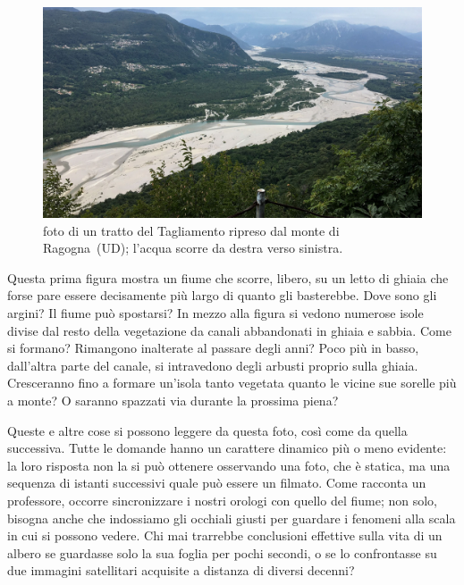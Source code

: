 

\begin{figure}[h]
	\centering
	\includegraphics[width=\textwidth]{files/foto_flagogna.jpg}
	\caption[foto di un tratto del Tagliamento ripreso dal monte di Ragogna]{foto di un tratto del Tagliamento ripreso dal monte di Ragogna~(UD); l'acqua scorre da destra verso sinistra.
	}
	\label{fig:foto-ragogna}
\end{figure}



Questa prima figura mostra un fiume che scorre, libero, su un letto di ghiaia che forse pare essere decisamente più largo di quanto gli basterebbe. 
Dove sono gli argini? Il fiume può spostarsi? 
%
In mezzo alla figura si vedono numerose isole divise dal resto della vegetazione da canali abbandonati in ghiaia e sabbia. 
Come si formano? Rimangono inalterate al passare degli anni? 
%
Poco più in basso, dall'altra parte del canale, si intravedono degli arbusti proprio sulla ghiaia. 
Cresceranno fino a formare un'isola tanto vegetata quanto le vicine sue sorelle più a monte? O saranno spazzati via durante la prossima piena?

\medskip
Queste e altre cose si possono leggere da questa foto, così come da quella successiva. Tutte le domande hanno un carattere dinamico più o meno evidente: la loro risposta non la si può ottenere osservando una foto, che è statica, ma una sequenza di istanti successivi quale può essere un filmato.
Come racconta un professore, occorre sincronizzare i nostri orologi con quello del fiume; non solo, bisogna anche che indossiamo gli occhiali giusti per guardare i fenomeni alla scala in cui si possono vedere. Chi mai trarrebbe conclusioni effettive sulla vita di un albero se guardasse solo la sua foglia per pochi secondi, o se lo confrontasse su due immagini satellitari acquisite a distanza di diversi decenni?

